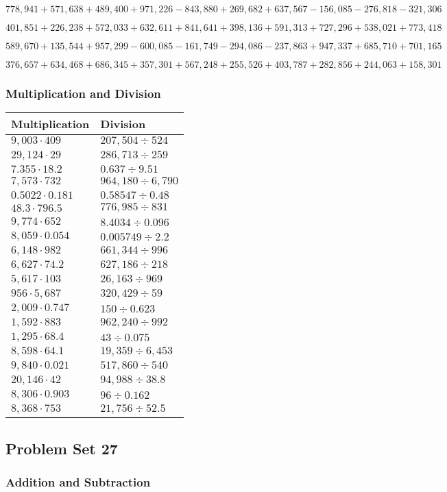 \(778,941+571,638+489,400+971,226-843,880+269,682+637,567-156,085-276,818-321,306\)

\(401,851+226,238+572,033+632,611+841,641+398,136+591,313+727,296+538,021+773,418\)

\(589,670+135,544+957,299-600,085-161,749-294,086-237,863+947,337+685,710+701,165\)

\(376,657+634,468+686,345+357,301+567,248+255,526+403,787+282,856+244,063+158,301\)

\hypertarget{multiplication-and-division-330}{%
\subsubsection{Multiplication and
Division}\label{multiplication-and-division-330}}

\begin{longtable}[]{@{}ll@{}}
\toprule
Multiplication & Division\tabularnewline
\midrule
\endhead
\(9,003\cdot409\) & \(207,504÷524\)\tabularnewline
\(29,124\cdot29\) & \(286,713÷259\)\tabularnewline
\(7.355\cdot18.2\) & \(0.637÷9.51\)\tabularnewline
\(7,573\cdot732\) & \(964,180÷6,790\)\tabularnewline
\(0.5022\cdot0.181\) & \(0.58547÷0.48\)\tabularnewline
\(48.3\cdot796.5\) & \(776,985÷831\)\tabularnewline
\(9,774\cdot652\) & \(8.4034÷0.096\)\tabularnewline
\(8,059\cdot0.054\) & \(0.005749 ÷2.2\)\tabularnewline
\(6,148\cdot982\) & \(661,344÷996\)\tabularnewline
\(6,627\cdot74.2\) & \(627,186÷218\)\tabularnewline
\(5,617\cdot103\) & \(26,163÷969\)\tabularnewline
\(956\cdot5,687\) & \(320,429÷59\)\tabularnewline
\(2,009\cdot0.747\) & \(150÷0.623\)\tabularnewline
\(1,592\cdot883\) & \(962,240÷992\)\tabularnewline
\(1,295\cdot68.4\) & \(43÷0.075\)\tabularnewline
\(8,598\cdot64.1\) & \(19,359÷6,453\)\tabularnewline
\(9,840\cdot0.021\) & \(517,860÷540\)\tabularnewline
\(20,146\cdot42\) & \(94,988÷38.8\)\tabularnewline
\(8,306\cdot0.903\) & \(96÷0.162\)\tabularnewline
\(8,368\cdot753\) & \(21,756÷52.5\)\tabularnewline
\bottomrule
\end{longtable}

\hypertarget{problem-set-27-5}{%
\subsection{Problem Set 27}\label{problem-set-27-5}}

\hypertarget{addition-and-subtraction-332}{%
\subsubsection{Addition and
Subtraction}\label{addition-and-subtraction-332}}

